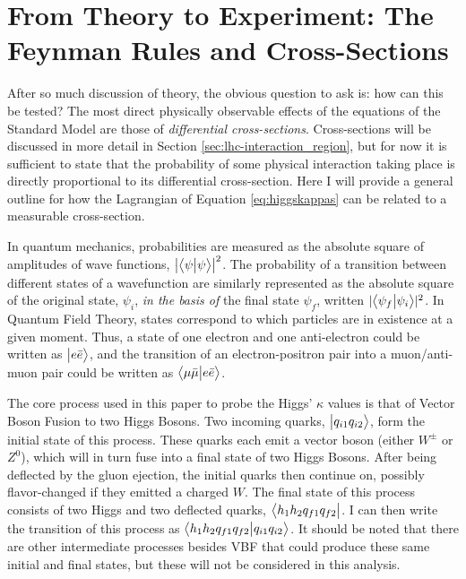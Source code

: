 \section{From Theory to Experiment: The Feynman Rules and Cross-Sections} \label{sec:feyn_rules}
    
    After so much discussion of theory, the obvious question to ask is: how can this be tested?
    The most direct physically observable effects of the equations of the Standard Model are those of \textit{differential cross-sections}.
    Cross-sections will be discussed in more detail in Section \ref{sec:lhc-interaction_region},
        but for now it is sufficient to state that the probability of some physical interaction taking place
        is directly proportional to its differential cross-section.
    Here I will provide a general outline for how the Lagrangian of Equation \ref{eq:higgskappas} can be related to a measurable cross-section.

    In quantum mechanics, probabilities are measured as the absolute square of amplitudes of wave functions, $\left|\big< \psi \big| \psi \big>\right|^2$.
    The probability of a transition between different states of a wavefunction are similarly represented
        as the absolute square of the original state, $\psi_i$, \textit{in the basis of} the final state $\psi_f$,
        written $ |\big< \psi_f \big| \psi_i \big>|^2$.
    In Quantum Field Theory, states correspond to which particles are in existence at a given moment.
    Thus, a state of one electron and one anti-electron could be written as $\big| e \bar{e} \big>$,
        and the transition of an electron-positron pair into a muon/anti-muon pair could be written
        as $\big< \mu \bar{\mu} \big| e \bar{e} \big>$.

    The core process used in this paper to probe the Higgs' $\kappa$ values is that of Vector Boson Fusion to two Higgs Bosons.
    Two incoming quarks, $\big| q_{i1} q_{i2} \big>$, form the initial state of this process.
    These quarks each emit a vector boson (either $W^{\pm}$ or $Z^0$), 
        which will in turn fuse into a final state of two Higgs Bosons.
    After being deflected by the gluon ejection, the initial quarks then continue on, possibly flavor-changed if they emitted a charged $W$.
    The final state of this process consists of two Higgs and two deflected quarks, $\big< h_1 h_2 q_{f1} q_{f2} \big|$.
    I can then write the transition of this process as $\big<  h_1 h_2 q_{f1} q_{f2} \big| q_{i1} q_{i2} \big>$.
    It should be noted that there are other intermediate processes besides VBF
        that could produce these same initial and final states, 
        but these will not be considered in this analysis.

